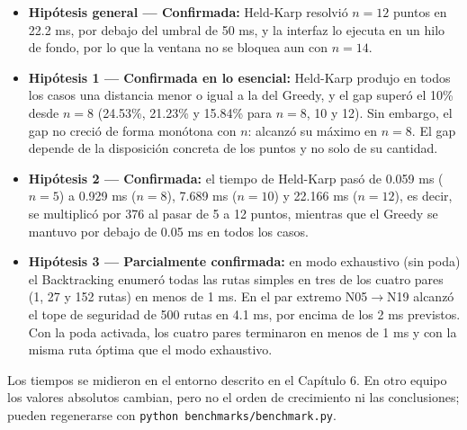 \begin{itemize}
    \item \textbf{Hipótesis general --- Confirmada:} Held-Karp resolvió $n=12$ puntos en 22.2 ms, por debajo del umbral de 50 ms, y la interfaz lo ejecuta en un hilo de fondo, por lo que la ventana no se bloquea aun con $n=14$.
    \item \textbf{Hipótesis 1 --- Confirmada en lo esencial:} Held-Karp produjo en todos los casos una distancia menor o igual a la del Greedy, y el gap superó el 10\% desde $n=8$ (24.53\%, 21.23\% y 15.84\% para $n=8$, 10 y 12). Sin embargo, el gap no creció de forma monótona con $n$: alcanzó su máximo en $n=8$. El gap depende de la disposición concreta de los puntos y no solo de su cantidad.
    \item \textbf{Hipótesis 2 --- Confirmada:} el tiempo de Held-Karp pasó de 0.059 ms ($n=5$) a 0.929 ms ($n=8$), 7.689 ms ($n=10$) y 22.166 ms ($n=12$), es decir, se multiplicó por 376 al pasar de 5 a 12 puntos, mientras que el Greedy se mantuvo por debajo de 0.05 ms en todos los casos.
    \item \textbf{Hipótesis 3 --- Parcialmente confirmada:} en modo exhaustivo (sin poda) el Backtracking enumeró todas las rutas simples en tres de los cuatro pares (1, 27 y 152 rutas) en menos de 1 ms. En el par extremo N05$\to$N19 alcanzó el tope de seguridad de 500 rutas en 4.1 ms, por encima de los 2 ms previstos. Con la poda activada, los cuatro pares terminaron en menos de 1 ms y con la misma ruta óptima que el modo exhaustivo.
\end{itemize}

Los tiempos se midieron en el entorno descrito en el Capítulo 6. En otro equipo los valores absolutos cambian, pero no el orden de crecimiento ni las conclusiones; pueden regenerarse con \texttt{python benchmarks/benchmark.py}.
